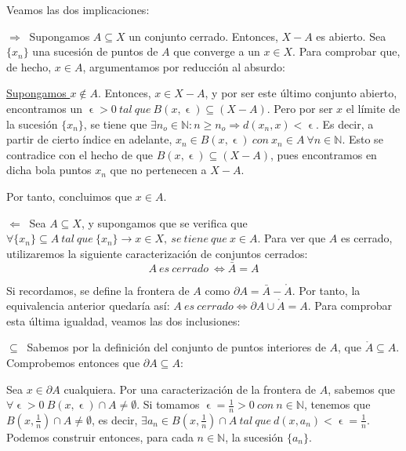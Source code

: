 \documentclass[11pt, a4paper, titlepage]{article}
\makeatletter
\let\epsilon\upvarepsilon
\renewenvironment{proof}[1][\proofname] {\vspace{-15pt}\par\pushQED{\qed}\normalfont\topsep6\p@\@plus6\p@\relax\trivlist\item[\hskip\labelsep\it#1\@addpunct{.}]\ignorespaces}{\popQED\endtrivlist\@endpefalse}
\theoremstyle{theorem-style}
\theoremstyle{definition-style}
\theoremstyle{remark-style}
\theoremstyle{example-style}
\makeatother
\begin{document}
\begin{proof} 
Veamos las dos implicaciones:

$\displaystyle \boxed{\Rightarrow}\ $ Supongamos $A \subseteq X$ un conjunto cerrado. Entonces, $X - A$ es abierto. Sea $\{x_n\}$ una sucesión de puntos de $A$ que converge a un $x\in X$. Para comprobar que, de hecho, $x\in A$, argumentamos por reducción al absurdo:

\underline{Supongamos $x\notin A$}. Entonces, $x\in X - A$, y por ser este último conjunto abierto, encontramos un $\epsilon > 0\ tal\ que\ B(x,\epsilon)\subseteq (X-A)$. Pero por ser $x$ el límite de la sucesión $\{x_n\}$, se tiene que $\exists n_o \in \mathbb{N}: n\geq n_o \Rightarrow d(x_n,x)<\epsilon$. Es decir, a partir de cierto índice en adelante, $x_n \in B(x,\epsilon)\ con\ x_n \in A\ \forall n \in \mathbb{N}$. Esto se contradice con el hecho de que $B(x,\epsilon)\subseteq (X-A)$, pues encontramos en dicha bola puntos $x_n$ que no pertenecen a $X-A$.

Por tanto, concluimos que $x\in A$.

$\displaystyle \boxed{\Leftarrow}\ $ Sea $A\subseteq X$, y supongamos que se verifica que $\forall \{x_n\} \subseteq A\ tal\ que\ \{x_n\} \rightarrow x \in X,\ se\ tiene\ que\ x\in A$. Para ver que $A$ es cerrado, utilizaremos la siguiente caracterización de conjuntos cerrados:
\vspace{0.5em}
$$A\ es\ cerrado\ \iff \bar{A} = A $$

Si recordamos, se define la frontera de $A$ como $\partial A = \bar{A} - \mathring{A}$. Por tanto, la equivalencia anterior quedaría así: $A\ es\ cerrado \iff \partial A \cup \mathring{A} = A$. Para comprobar esta última igualdad, veamos las dos inclusiones:

\begin{description}
\item $\displaystyle \boxed{\subseteq}\ $ Sabemos por la definición del conjunto de puntos interiores de $A$, que $\mathring{A} \subseteq A$. \\ Comprobemos entonces que $\partial A \subseteq A$:

Sea $x\in \partial A$ cualquiera. Por una caracterización de la frontera de $A$, sabemos que $\forall \epsilon > 0\ B(x,\epsilon)\cap A \neq \emptyset$. Si tomamos $\epsilon = \frac{1}{n} > 0\ con \ n\in \mathbb{N}$, tenemos que $B(x,\frac{1}{n})\cap A \neq \emptyset$, es decir, $\exists a_n \in B(x,\frac{1}{n})\cap A\ tal\ que\ d(x,a_n)<\epsilon = \frac{1}{n}$. Podemos construir entonces, para cada $n \in \mathbb{N}$, la sucesión $\{a_n\}$.


\end{description}
\end{proof}
\end{document}
